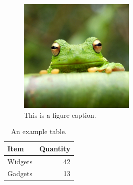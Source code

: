\begin{figure}
\centering
\includegraphics[width=0.5\textwidth]{frog.jpg}
\caption{\label{fig:frog}This is a figure caption.}
\end{figure}

\begin{table}
\centering
\begin{tabular}{l|r}
Item & Quantity \\\hline
Widgets & 42 \\
Gadgets & 13
\end{tabular}
\caption{\label{tab:widgets}An example table.}
\end{table}